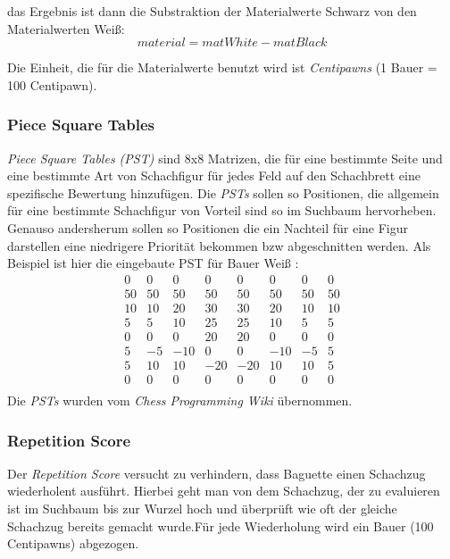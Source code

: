 das Ergebnis ist dann die Substraktion der Materialwerte Schwarz von den Materialwerten Weiß: 
$$
material = matWhite - matBlack
$$

Die Einheit, die f\"ur die Materialwerte benutzt wird ist \textit{Centipawns} (1 Bauer = 100 Centipawn).

\subsubsection{Piece Square Tables}
\textit{Piece Square Tables (PST)} sind  8x8 Matrizen, die für eine bestimmte Seite und eine bestimmte Art von Schachfigur für jedes Feld auf den Schachbrett eine spezifische Bewertung hinzuf\"ugen.
Die \textit{PSTs} sollen so Positionen, die allgemein f\"ur eine bestimmte Schachfigur von Vorteil sind so im Suchbaum hervorheben. Genauso andersherum sollen so Positionen die ein Nachteil f\"ur eine Figur darstellen eine niedrigere Priorit\"at bekommen bzw abgeschnitten werden.
\newline Als Beispiel ist hier die eingebaute PST für Bauer Weiß : 
$$
\begin{matrix}
         0 &  0 &  0 &  0 &  0 &  0 &  0 &  0 \\
        50 & 50 & 50 & 50 & 50 & 50 & 50 & 50 \\
        10 & 10 & 20 & 30 & 30 & 20 & 10 & 10 \\
         5 &  5 & 10 & 25 & 25 & 10 &  5 &  5 \\
         0 &  0 &  0 & 20 & 20 &  0 &  0 &  0 \\
         5 & -5 &-10 &  0 &  0 &-10 & -5 &  5 \\
         5 & 10 & 10 &-20 &-20 & 10 & 10 &  5 \\
         0 &  0 &  0 &  0 &  0 &  0 &  0 &  0 \\
\end{matrix}
$$
Die \textit{PSTs} wurden vom \textit{Chess Programming Wiki} \citeeval[] \"ubernommen.

\subsubsection{Repetition Score}
Der \textit{Repetition Score} versucht zu verhindern, dass Baguette einen Schachzug wiederholent ausf\"uhrt.\newline
Hierbei geht man von dem Schachzug, der zu evaluieren ist im Suchbaum bis zur Wurzel hoch und \"uberpr\"uft wie oft der gleiche Schachzug bereits gemacht wurde.\newline F\"ur jede Wiederholung wird ein Bauer (100 Centipawns) abgezogen.
